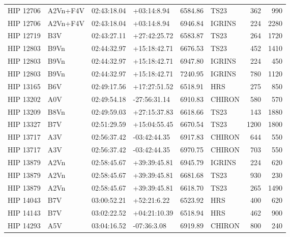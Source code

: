 \documentclass{emulateapj}
\begin{document}
\begin{longtable*}{|l|lllrlrr|}
   HIP 12706 &       A2Vn+F4V &    02:43:18.04 &    +03:14:8.94 &  6584.86 &       TS23 &      362 &     990 \\
   HIP 12706 &       A2Vn+F4V &    02:43:18.04 &    +03:14:8.94 &  6946.84 &     IGRINS &      224 &    2280 \\
   HIP 12719 &            B3V &    02:43:27.11 &   +27:42:25.72 &  6583.87 &       TS23 &      264 &    1720 \\
   HIP 12803 &           B9Vn &    02:44:32.97 &   +15:18:42.71 &  6676.53 &       TS23 &      452 &    1410 \\
   HIP 12803 &           B9Vn &    02:44:32.97 &   +15:18:42.71 &  6947.80 &     IGRINS &      224 &     450 \\
   HIP 12803 &           B9Vn &    02:44:32.97 &   +15:18:42.71 &  7240.95 &     IGRINS &      780 &    1120 \\
   HIP 13165 &            B6V &    02:49:17.56 &   +17:27:51.52 &  6518.91 &        HRS &      275 &     850 \\
   HIP 13202 &            A0V &    02:49:54.18 &   -27:56:31.14 &  6910.83 &     CHIRON &      580 &     570 \\
   HIP 13209 &           B8Vn &    02:49:59.03 &   +27:15:37.83 &  6618.66 &       TS23 &      143 &    1880 \\
   HIP 13327 &            B7V &    02:51:29.59 &   +15:04:55.45 &  6670.54 &       TS23 &     1200 &    1800 \\
   HIP 13717 &            A3V &    02:56:37.42 &   -03:42:44.35 &  6917.83 &     CHIRON &      644 &     550 \\
   HIP 13717 &            A3V &    02:56:37.42 &   -03:42:44.35 &  6970.75 &     CHIRON &      703 &     550 \\
   HIP 13879 &           A2Vn &    02:58:45.67 &   +39:39:45.81 &  6945.79 &     IGRINS &      224 &     620 \\
   HIP 13879 &           A2Vn &    02:58:45.67 &   +39:39:45.81 &  6681.68 &       TS23 &      930 &     230 \\
   HIP 13879 &           A2Vn &    02:58:45.67 &   +39:39:45.81 &  6618.70 &       TS23 &      265 &    1490 \\
   HIP 14043 &            B7V &    03:00:52.21 &    +52:21:6.22 &  6523.92 &        HRS &      400 &     620 \\
   HIP 14143 &            B7V &    03:02:22.52 &   +04:21:10.39 &  6518.94 &        HRS &      462 &     900 \\
   HIP 14293 &            A5V &    03:04:16.52 &    -07:36:3.08 &  6919.89 &     CHIRON &      800 &     240 \\

\end{longtable*}
\end{document}
